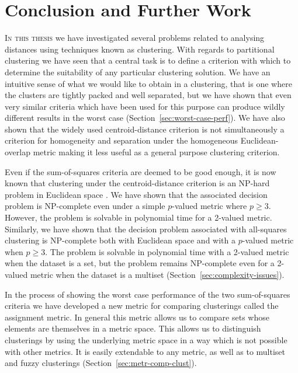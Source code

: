 \chapter{Conclusion and Further Work}
\label{cha:conclusion}

\textsc{In this thesis} we have investigated several problems related to
analysing distances using techniques known as clustering.  With regards to
partitional clustering we have seen that a central task is to define a
criterion with which to determine the suitability of any particular clustering
solution.  We have an intuitive sense of what we would like to obtain in a
clustering, that is one where the clusters are tightly packed and well
separated, but we have shown that even very similar criteria which have been
used for this purpose can produce wildly different results in the worst case
(Section~\ref{sec:worst-case-perf}).  We have also shown that the widely used
centroid-distance criterion is not simultaneously a criterion for homogeneity
and separation under the homogeneous Euclidean-overlap metric making it less
useful as a general purpose clustering criterion.

Even if the sum-of-squares criteria are deemed to be good enough, it is now
known that clustering under the centroid-distance criterion is an NP-hard
problem in Euclidean space \cite{aloise09,mahajan09}.  We have shown that the
associated decision problem is NP-complete even under a simple $p$-valued
metric where $p \geq 3$.  However, the problem is solvable in polynomial time
for a 2-valued metric.  Similarly, we have shown that the decision problem
associated with all-squares clustering is NP-complete both with Euclidean
space and with a $p$-valued metric when $p \geq 3$.  The problem is solvable
in polynomial time with a 2-valued metric when the dataset is a set, but the
problem remains NP-complete even for a 2-valued metric when the dataset is a
multiset (Section~\ref{sec:complexity-issues}).

In the process of showing the worst case performance of the two sum-of-squares
criteria we have developed a new metric for comparing clusterings called the
assignment metric.  In general this metric allows us to compare sets whose
elements are themselves in a metric space.  This allows us to distinguish
clusterings by using the underlying metric space in a way which is not
possible with other metrics.  It is easily extendable to any metric, as well
as to multiset and fuzzy clusterings (Section~\ref{sec:metr-comp-clust}).

